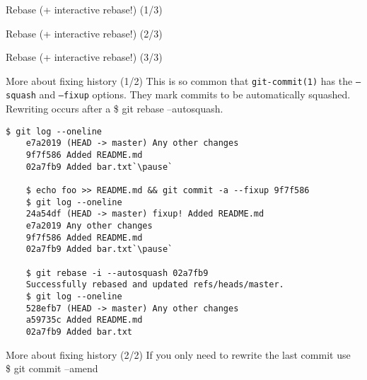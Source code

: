 \begin{frame}{Rebase (+ interactive rebase!) (1/3)}
\end{frame}

\begin{frame}{Rebase (+ interactive rebase!) (2/3)}
\end{frame}

\begin{frame}{Rebase (+ interactive rebase!) (3/3)}
\end{frame}

\begin{frame}[fragile]{More about fixing history (1/2)}
  This is so common that \texttt{git-commit(1)} has the \texttt{--squash} and \texttt{--fixup} options. They mark commits to be automatically squashed. Rewriting occurs after a {\ttfamily\scriptsize\$ git rebase --autosquash}.
  \pause
  \begin{lstlisting}[style=bash]
    $ git log --oneline
    e7a2019 (HEAD -> master) Any other changes
    9f7f586 Added README.md
    02a7fb9 Added bar.txt`\pause`

    $ echo foo >> README.md && git commit -a --fixup 9f7f586
    $ git log --oneline
    24a54df (HEAD -> master) fixup! Added README.md
    e7a2019 Any other changes
    9f7f586 Added README.md
    02a7fb9 Added bar.txt`\pause`

    $ git rebase -i --autosquash 02a7fb9
    Successfully rebased and updated refs/heads/master.
    $ git log --oneline
    528efb7 (HEAD -> master) Any other changes
    a59735c Added README.md
    02a7fb9 Added bar.txt
  \end{lstlisting}

  \gitRebaseWarning
\end{frame}

\begin{frame}{More about fixing history (2/2)}
  If you only need to rewrite the last commit use\\ {\ttfamily\scriptsize\$ git commit --amend}

  \gitRebaseWarning
\end{frame}

